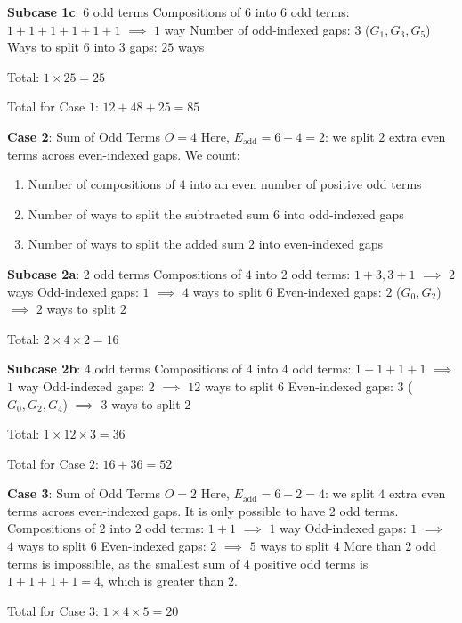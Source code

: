 \begin{enumerate}
 
\textbf{Subcase 1c}: 6 odd terms
Compositions of $6$ into 6 odd terms: $1+1+1+1+1+1$ $\implies$ $1$ way
Number of odd-indexed gaps: $3$ ($G_1, G_3, G_5$)
Ways to split $6$ into 3 gaps: $25$ ways


 Total: $1 \times 25 = 25$

 


 Total for Case $1$: $12 + 48 + 25 = 85$

 
\textbf{Case 2}: Sum of Odd Terms $O = 4$
Here, $E_{\text{add}} = 6 - 4 = 2$: we split $2$ extra even terms across even-indexed gaps. We count:


 
            \begin{enumerate}
        \item Number of compositions of $4$ into an even number of positive odd terms
        \item Number of ways to split the subtracted sum $6$ into odd-indexed gaps
        \item Number of ways to split the added sum $2$ into even-indexed gaps
            \end{enumerate}
            
\textbf{Subcase 2a}: 2 odd terms
Compositions of $4$ into 2 odd terms: $1+3, 3+1$ $\implies$ $2$ ways
Odd-indexed gaps: $1$ $\implies$ $4$ ways to split $6$
Even-indexed gaps: $2$ ($G_0, G_2$) $\implies$ $2$ ways to split $2$


 Total: $2 \times 4 \times 2 = 16$

 
\textbf{Subcase 2b}: 4 odd terms
Compositions of $4$ into 4 odd terms: $1+1+1+1$ $\implies$ $1$ way
Odd-indexed gaps: $2$ $\implies$ $12$ ways to split $6$
Even-indexed gaps: $3$ ($G_0, G_2, G_4$) $\implies$ $3$ ways to split $2$


 Total: $1 \times 12 \times 3 = 36$

 


 Total for Case $2$: $16 + 36 = 52$

 
\textbf{Case 3}: Sum of Odd Terms $O = 2$
Here, $E_{\text{add}} = 6 - 2 = 4$: we split $4$ extra even terms across even-indexed gaps.
It is only possible to have 2 odd terms.
Compositions of $2$ into 2 odd terms: $1+1$ $\implies$ $1$ way
Odd-indexed gaps: $1$ $\implies$ $4$ ways to split $6$
Even-indexed gaps: $2$ $\implies$ $5$ ways to split $4$
More than $2$ odd terms is impossible, as the smallest sum of 4 positive odd terms is $1+1+1+1=4$, which is greater than $2$.


 Total for Case $3$: $1 \times 4 \times 5 = 20$


\end{enumerate}
